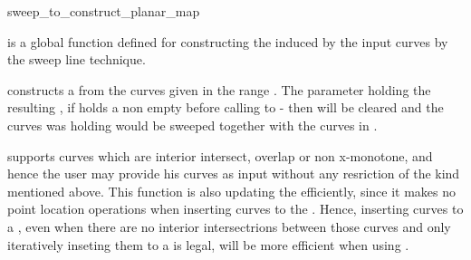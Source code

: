 
\ccRefPageBegin


\begin{ccRefFunction}{sweep_to_construct_planar_map}


\ccDefinition
{} is a global function defined for constructing the  
induced by the input curves by the sweep line technique.



\def\ccLongParamLayout{\ccTrue} 


constructs a  from the curves given in the range 
\ccStyle{[curves_begin, curves_end)}. The parameter  holding the resulting , if  holds a non empty  before calling to  - then  will be cleared and the curves  was holding would be sweeped together with the curves in \ccStyle{[curves_begin, curves_end)}.

 supports curves which are interior intersect, overlap or non x-monotone, and hence the user may provide his curves as input without any resriction of the kind mentioned above. 
This function is also updating the  efficiently, since it makes no point location operations when inserting curves to the . Hence, inserting curves to a , even when there are no interior intersectrions between those curves and only iteratively inseting them to a  is legal, will be more efficient when using .


\end{ccRefFunction}
